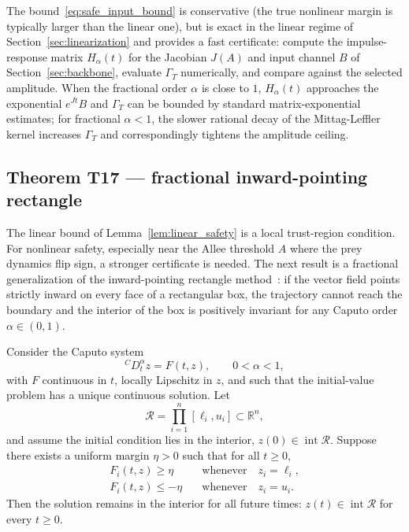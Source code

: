 The bound~\eqref{eq:safe_input_bound} is conservative (the true nonlinear margin is typically larger than the linear one), but is exact in the linear regime of Section~\ref{sec:linearization} and provides a fast certificate: compute the impulse-response matrix \(H_\alpha(t)\) for the Jacobian \(J(A)\) and input channel \(B\) of Section~\ref{sec:backbone}, evaluate \(\Gamma_T\) numerically, and compare against the selected amplitude. When the fractional order \(\alpha\) is close to \(1\), \(H_\alpha(t)\) approaches the exponential \(e^{Jt}B\) and \(\Gamma_T\) can be bounded by standard matrix-exponential estimates; for fractional \(\alpha < 1\), the slower rational decay of the Mittag-Leffler kernel increases \(\Gamma_T\) and correspondingly tightens the amplitude ceiling.

\subsection{Theorem T17 --- fractional inward-pointing rectangle}

The linear bound of Lemma~\ref{lem:linear_safety} is a local trust-region condition. For nonlinear safety, especially near the Allee threshold \(A\) where the prey dynamics flip sign, a stronger certificate is needed. The next result is a fractional generalization of the inward-pointing rectangle method~\cite{F02}: if the vector field points strictly inward on every face of a rectangular box, the trajectory cannot reach the boundary and the interior of the box is positively invariant for any Caputo order \(\alpha \in (0, 1)\).

\begin{theorem}
\label{thm:T17}
Consider the Caputo system
\begin{equation}
{}^C D_t^\alpha z = F(t, z),\qquad 0 < \alpha < 1,
\label{eq:system_rect}
\end{equation}
with \(F\) continuous in \(t\), locally Lipschitz in \(z\), and such that the initial-value problem has a unique continuous solution. Let
\begin{equation}
\mathcal{R} = \prod_{i=1}^n [\ell_i, u_i] \subset \mathbb{R}^n,
\label{eq:rectangle}
\end{equation}
and assume the initial condition lies in the interior, \(z(0) \in \operatorname{int}\mathcal{R}\). Suppose there exists a uniform margin \(\eta > 0\) such that for all \(t \ge 0\),
\begin{align}
F_i(t, z) \ge \eta \quad&\text{whenever}\quad z_i = \ell_i, \label{eq:f_lower} \\
F_i(t, z) \le -\eta \quad&\text{whenever}\quad z_i = u_i. \label{eq:f_upper}
\end{align}
Then the solution remains in the interior for all future times: \(z(t) \in \operatorname{int}\mathcal{R}\) for every \(t \ge 0\).
\end{theorem}

